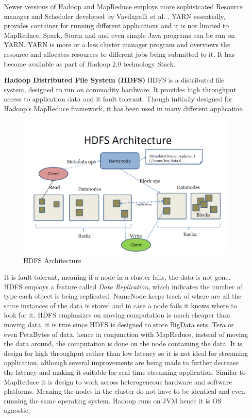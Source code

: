\documentclass[english]{tktltiki}
\begin{document}
Newer versions of Hadoop and MapReduce employs more sophistcated Resource manager and Scheduler developed by Vavilapalli et al. \cite{vavila13}. YARN essentially, provides container for running different applications and it is not limited to MapReduce. Spark, Storm and and even simple Java programs can be run on YARN. YARN is more or a less cluster manager program and overviews the resource and allocates resources to different jobs being submitted to it. It has become available as part of Hadoop 2.0 technology Stack.



\textbf{Hadoop Distributed File System (HDFS)}
HDFS is a distributed file system, designed to run on commodity hardware. It provides high throughput access to application data and it fault tolerant. Though initially designed for Hadoop's MapReduce framework, it has been used in many different application.
\begin{figure}[ht!]
\centering
\includegraphics[width=130mm]{figures/hdfsarchitecture.png}
\caption{HDFS Architecture}
\end{figure}

It is fault tolerant, meaning if a node in a cluster fails, the data is not gone. HDFS employs a feature called \textit{Data Replication}, which indicates the number of type each object is being replicated. NameNode keeps track of where are all the same instances of the data is stored and in case a node fails it knows where to look for it. HDFS emphasizes on moving computation is much cheaper than moving data, it is true since HDFS is designed to store BigData sets, Tera or even PetaBytes of data, hence in conjunction with MapReduce, instead of moving the data around, the computation is done on the node containing the data. It is design for high throughput  rather than low latency so it is not ideal for streaming application, although several improvements are being made to further decrease the latency and making it suitable for real time streaming application. Similar to MapReduce it is design to work across heterogeneous hardware and software platforms. Meaning the nodes in the cluster do not have to be identical and even running the same operating system. Hadoop runs on JVM hence it is OS agnostic. 
\end{document}
